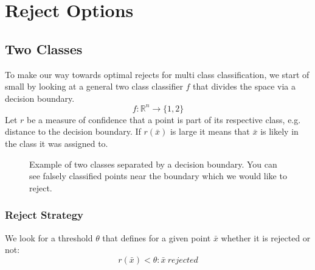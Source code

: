 %
\chapter{Reject Options}
\label{sec:options}

\section{Two Classes}
\label{twoclasses}
To make our way towards optimal rejects for multi class classification, we start of small by looking at a general two class classifier $f$ that divides the space via a decision boundary. 
$$ f: \mathbb{R}^n \to \{1,2\} $$
Let $r$ be a measure of confidence that a point is part of its respective class, e.g. distance to the decision boundary. If $r(\bar{x})$ is large it means that $\bar{x}$ is likely in the class it was assigned to.

\begin{figure}
\centering
\caption{Example of two classes separated by a decision boundary. You can see falsely classified points near the boundary which we would like to reject.}
\label{decBound}
\end{figure}

\subsection{Reject Strategy}
We look for a threshold $\theta$ that defines for a given point $\bar{x}$ whether it is rejected or not:
$$ r(\bar{x}) < \theta : \bar{x} \  rejected $$

